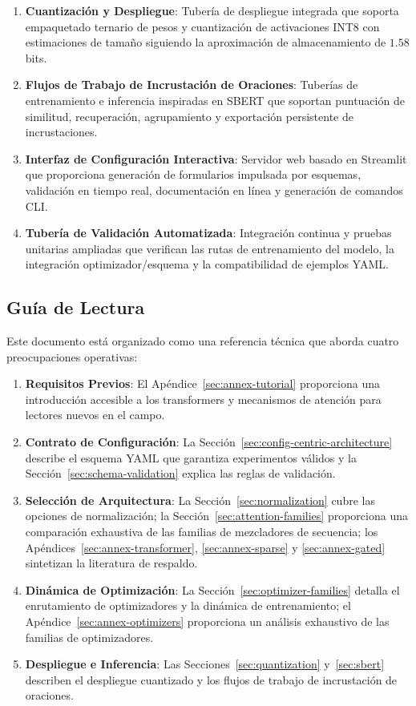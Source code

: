 \documentclass[11pt,a4paper]{article}
\begin{document}
\begin{enumerate}[leftmargin=*]
    \item \textbf{Cuantización y Despliegue}: Tubería de despliegue integrada que soporta empaquetado ternario de pesos y cuantización de activaciones INT8 con estimaciones de tamaño siguiendo la aproximación de almacenamiento de $1.58$ bits.
    \item \textbf{Flujos de Trabajo de Incrustación de Oraciones}: Tuberías de entrenamiento e inferencia inspiradas en SBERT que soportan puntuación de similitud, recuperación, agrupamiento y exportación persistente de incrustaciones.
    \item \textbf{Interfaz de Configuración Interactiva}: Servidor web basado en Streamlit que proporciona generación de formularios impulsada por esquemas, validación en tiempo real, documentación en línea y generación de comandos CLI.
    \item \textbf{Tubería de Validación Automatizada}: Integración continua y pruebas unitarias ampliadas que verifican las rutas de entrenamiento del modelo, la integración optimizador/esquema y la compatibilidad de ejemplos YAML.
\end{enumerate}

\subsection{Guía de Lectura}

Este documento está organizado como una referencia técnica que aborda cuatro preocupaciones operativas:
\begin{enumerate}[leftmargin=*]
    \item \textbf{Requisitos Previos}: El Apéndice~\ref{sec:annex-tutorial} proporciona una introducción accesible a los transformers y mecanismos de atención para lectores nuevos en el campo.
    \item \textbf{Contrato de Configuración}: La Sección~\ref{sec:config-centric-architecture} describe el esquema YAML que garantiza experimentos válidos y la Sección~\ref{sec:schema-validation} explica las reglas de validación.
    \item \textbf{Selección de Arquitectura}: La Sección~\ref{sec:normalization} cubre las opciones de normalización; la Sección~\ref{sec:attention-families} proporciona una comparación exhaustiva de las familias de mezcladores de secuencia; los Apéndices~\ref{sec:annex-transformer}, \ref{sec:annex-sparse} y \ref{sec:annex-gated} sintetizan la literatura de respaldo.
    \item \textbf{Dinámica de Optimización}: La Sección~\ref{sec:optimizer-families} detalla el enrutamiento de optimizadores y la dinámica de entrenamiento; el Apéndice~\ref{sec:annex-optimizers} proporciona un análisis exhaustivo de las familias de optimizadores.
    \item \textbf{Despliegue e Inferencia}: Las Secciones~\ref{sec:quantization} y~\ref{sec:sbert} describen el despliegue cuantizado y los flujos de trabajo de incrustación de oraciones.
\end{enumerate}
\end{document}
